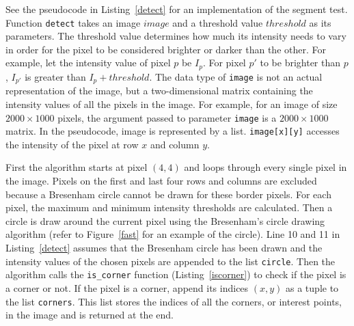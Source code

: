 See the pseudocode in Listing~\ref{detect} for an implementation of the segment test. Function \texttt{detect} takes an image $image$ and a threshold value $threshold$ as its parameters. The threshold value determines how much its intensity needs to vary in order for the pixel to be considered brighter or darker than the other. For example, let the intensity value of pixel $p$ be $I_p$. For pixel $p'$ to be brighter than $p$, $I_{p'}$ is greater than $I_p + threshold$. The data type of \texttt{image} is not an actual representation of the image, but a two-dimensional matrix containing the intensity values of all the pixels in the image. For example, for an image of size $2000 \times 1000$ pixels, the argument passed to parameter \texttt{image} is a $2000 \times 1000$ matrix. In the pseudocode, image is represented by a list. \texttt{image[x][y]} accesses the intensity of the pixel at row $x$ and column $y$.

First the algorithm starts at pixel $(4,4)$ and loops through every single pixel in the image. Pixels on the first and last four rows and columns are excluded because a Bresenham circle cannot be drawn for these border pixels. For each pixel, the maximum and minimum intensity thresholds are calculated. Then a circle is draw around the current pixel using the Bresenham's circle drawing algorithm (refer to Figure~\ref{fast} for an example of the circle). Line 10 and 11 in Listing~\ref{detect} assumes that the Bresenham circle has been drawn and the intensity values of the chosen pixels are appended to the list \texttt{circle}. Then the algorithm calls the \texttt{is\_corner} function (Listing~\ref{iscorner}) to check if the pixel is a corner or not. If the pixel is a corner, append its indices $(x, y)$ as a tuple to the list \texttt{corners}. This list stores the indices of all the corners, or interest points, in the image and is returned at the end.

